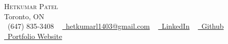 \addtolength{\oddsidemargin}{-0.6in}
\addtolength{\evensidemargin}{-0.5in}
\addtolength{\textwidth}{1.19in}
\addtolength{\topmargin}{-.7in}
\addtolength{\textheight}{1.4in}


\raggedbottom
\raggedright
\setlength{\tabcolsep}{0in}

\titleformat{\section}{
  \vspace{-4pt}\scshape\raggedright\large\bfseries
}{}{0em}{}[\color{black}\titlerule \vspace{-5pt}]


\newcommand{\resumeItem}[1]{\item\small{{#1 \vspace{-2pt}}}}
\newcommand{\resumeSubheading}[4]{\vspace{-2pt}\item
    \begin{tabular*}{1.0\textwidth}[t]{l@{\extracolsep{\fill}}r}
      \textbf{#1} & \textbf{\small #2} \\
      \textit{\small#3} & \textit{\small #4} \\
    \end{tabular*}\vspace{-7pt}}
\newcommand{\resumeProjectHeading}[2]{\item
    \begin{tabular*}{1.001\textwidth}{l@{\extracolsep{\fill}}r}
      \small#1 & \textbf{\small #2}\\
    \end{tabular*}\vspace{-7pt}}
\newcommand{\resumeItemListStart}{\begin{itemize}}
\newcommand{\resumeItemListEnd}{\end{itemize}\vspace{-5pt}}
\newcommand{\resumeSubHeadingListStart}{\begin{itemize}[leftmargin=0.0in, label={}]} 
\newcommand{\resumeSubHeadingListEnd}{\end{itemize}}



\begin{center}
    {\Huge \scshape Hetkumar Patel } \\ \vspace{1pt}
    Toronto, ON \\ \vspace{1pt}
    \small \faPhone\ (647) 835-3408  ~ \href{mailto:hetkumar.patel1403@gmail.com}{\faEnvelope~hetkumarl1403@gmail.com} ~ 
    \href{https://linkedin.com/in/h3t08}{\faLinkedin\ LinkedIn} ~
    \href{https://github.com/het0814}{\faGithub\ Github} ~
    \href{https://het0814.github.io/}{\faGlobe~Portfolio Website}
\end{center}


